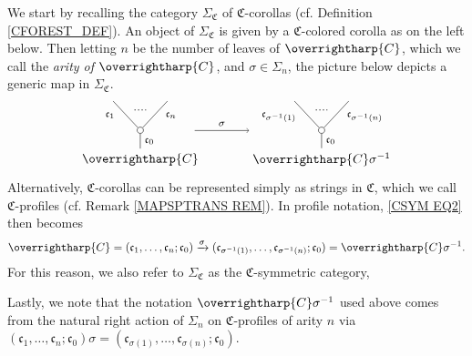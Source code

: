 \documentclass[a4paper,10pt
,draft
]{article}%
\numberwithin{equation}{section}
\numberwithin{figure}{section}
\theoremstyle{definition} %
\newcommand{\vect}[1]{\text{\overrightharp{\ensuremath{#1}}}}
\newcommand{\1}{\ensuremath{\mathbbm 1}}%
\begin{document}
We start by recalling the category 
$\Sigma_{\mathfrak{C}}$
of $\mathfrak{C}$-corollas (cf. Definition \ref{CFOREST_DEF}).
An object of $\Sigma_{\mathfrak{C}}$
is given by a 
$\mathfrak{C}$-colored corolla as on the left below.
Then letting $n$ be the number of leaves of $\vect{C}$,
which we call the \emph{arity of $\vect{C}$},
and $\sigma \in \Sigma_n$,
the picture below depicts a 
generic map in $\Sigma_{\mathfrak{C}}$.
\begin{equation}\label{CSYM EQ2}
\begin{tikzpicture}
[grow=up,auto,level distance=2.3em,every node/.style = {font=\footnotesize},dummy/.style={circle,draw,inner sep=0pt,minimum size=1.75mm}]

\node at (0,0) [font=\normalsize]{$\vect{C}$}
child{node [dummy] {}
	child{
		edge from parent node [swap,near end] {$\mathfrak c_n$} node [name=Kn] {}}
	child{
		edge from parent node [near end] {$\mathfrak c_1$}
		node [name=Kone,swap] {}}
	edge from parent node [swap] {$\mathfrak c_0$}
};
\draw [dotted,thick] (Kone) -- (Kn) ;
\node at (5,0) [font=\normalsize] {$\vect{C} \sigma^{-1}
	$}
child{node [dummy] {}
	child{
		edge from parent node [swap,near end] {$\mathfrak c_{\sigma^{-1}(n)}$} node [name=Kn] {}}
	child{
		edge from parent node [near end] {$\mathfrak c_{\sigma^{-1}(1)}$}
		node [name=Kone,swap] {}}
	edge from parent node [swap] {$\mathfrak c_0$}
};
\draw [dotted,thick] (Kone) -- (Kn) ;

\draw[->] (1.5,0.8) -- node{$\sigma$} (3,0.8);
\end{tikzpicture}
\end{equation}
Alternatively,
$\mathfrak{C}$-corollas can be represented simply as
strings in $\mathfrak{C}$,
which we call $\mathfrak{C}$-profiles
(cf. Remark \ref{MAPSPTRANS REM}).
In profile notation, 
\eqref{CSYM EQ2} then becomes
\begin{equation}\label{CSYM EQ1}
\vect{C} =
(\mathfrak c_1, \dots, \mathfrak c_n; \mathfrak c_0) \xrightarrow{\sigma} (\mathfrak c_{\sigma^{-1}(1)}, \dots, \mathfrak c_{\sigma^{-1}(n)}; \mathfrak c_0)
= \vect{C} \sigma^{-1}.
\end{equation}
For this reason, we also refer to 
$\Sigma_{\mathfrak{C}}$ as the 
$\mathfrak{C}$-symmetric category,

Lastly, we note that the notation
$\vect{C} \sigma^{-1}$ used above
comes from the natural right action of $\Sigma_n$
on $\mathfrak{C}$-profiles of arity $n$ via
$
(\mathfrak c_1, \dots, \mathfrak c_n; \mathfrak c_0) \sigma
=
(\mathfrak c_{\sigma(1)}, \dots, \mathfrak c_{\sigma(n)}; \mathfrak c_0)$.
\end{document}
